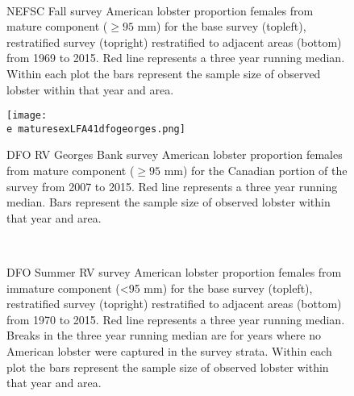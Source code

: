 \documentclass[11pt]{article}
\newcommand{\e}{/backup/bio_data/bio.lobster/figures/} %
\begin{document}
\begin{figure}
\centering
{}
\\
\caption{NEFSC Fall survey American lobster proportion females from mature component ($ \ge 95$ mm) for the base survey (topleft), restratified survey (topright) restratified to adjacent areas (bottom) from 1969 to 2015. Red line represents a three year running median. Within each plot the bars represent the sample size of observed lobster within that year and area. }
\end{figure}
\clearpage


\begin{figure}

    \texttt{[image: \\e maturesexLFA41dfogeorges.png]}
    \caption{DFO RV Georges Bank survey American lobster proportion females from mature component ($ \ge 95$ mm) for the Canadian portion of the survey from 2007 to 2015. Red line represents a three year running median. Bars represent the sample size of observed lobster within that year and area.}

\end{figure}


\begin{figure}
\centering
{}
\\
\caption{DFO Summer RV survey American lobster proportion females from immature component (\textless 95 mm) for the base survey (topleft), restratified survey (topright) restratified to adjacent areas (bottom) from 1970 to 2015. Red line represents a three year running median. Breaks in the three year running median are for years where no American lobster were captured in the survey strata. Within each plot the bars represent the sample size of observed lobster within that year and area.}
\end{figure}
\clearpage
\end{document}
